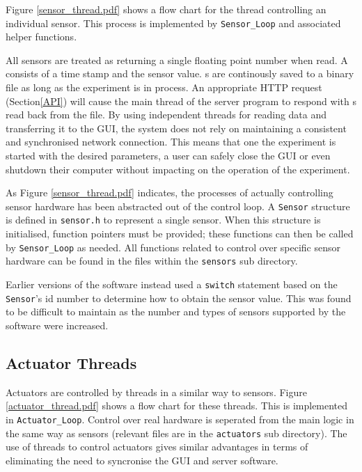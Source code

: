 Figure \ref{sensor_thread.pdf} shows a flow chart for the thread controlling an individual sensor. This process is implemented by \verb/Sensor_Loop/ and associated helper functions.

All sensors are treated as returning a single floating point number when read. A  consists of a time stamp and the sensor value. s are continously saved to a binary file as long as the experiment is in process. An appropriate HTTP request (Section\ref{API}) will cause the main thread of the server program to respond with s read back from the file. By using independent threads for reading data and transferring it to the GUI, the system does not rely on maintaining a consistent and synchronised network connection. This means that one the experiment is started with the desired parameters, a user can safely close the GUI or even shutdown their computer without impacting on the operation of the experiment.



As Figure \ref{sensor_thread.pdf} indicates, the processes of actually controlling sensor hardware has been abstracted out of the control loop. A \verb/Sensor/ structure is defined in \verb/sensor.h/ to represent a single sensor. When this structure is initialised, function pointers must be provided; these functions can then be called by \verb/Sensor_Loop/ as needed. All functions related to control over specific sensor hardware can be found in the files within the \verb/sensors/ sub directory.

Earlier versions of the software instead used a \verb/switch/ statement based on the \verb/Sensor/'s id number to determine how to obtain the sensor value. This was found to be difficult to maintain as the number and types of sensors supported by the software were increased.



\subsection{Actuator Threads}\label{Actuator Thread}

Actuators are controlled by threads in a similar way to sensors. Figure \ref{actuator_thread.pdf} shows a flow chart for these threads. This is implemented in \verb/Actuator_Loop/. Control over real hardware is seperated from the main logic in the same way as sensors (relevant files are in the \verb/actuators/ sub directory). The use of threads to control actuators gives similar advantages in terms of eliminating the need to syncronise the GUI and server software.

